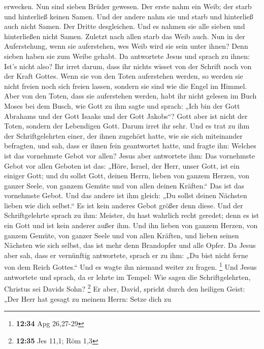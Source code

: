 erwecken.  Nun sind sieben Brüder gewesen. Der erste nahm
ein Weib; der starb und hinterließ keinen Samen.  Und der
andere nahm sie und starb und hinterließ auch nicht Samen. Der Dritte
desgleichen.  Und es nahmen sie alle sieben und
hinterließen nicht Samen. Zuletzt nach allen starb das Weib auch.
 Nun in der Auferstehung, wenn sie auferstehen, wes Weib
wird sie sein unter ihnen? Denn sieben haben sie zum Weibe gehabt.
 Da antwortete Jesus und sprach zu ihnen: Ist's nicht also?
Ihr irret darum, dass ihr nichts wisset von der Schrift noch von der
Kraft Gottes.  Wenn sie von den Toten auferstehen werden,
so werden sie nicht freien noch sich freien lassen, sondern sie sind wie
die Engel im Himmel.  Aber von den Toten, dass sie
auferstehen werden, habt ihr nicht gelesen im Buch Moses bei dem Busch,
wie Gott zu ihm sagte und sprach: „Ich bin der Gott Abrahams und der
Gott Isaaks und der Gott Jakobs``?  Gott aber ist nicht der
Toten, sondern der Lebendigen Gott. Darum irret ihr sehr. 
Und es trat zu ihm der Schriftgelehrten einer, der ihnen zugehört hatte,
wie sie sich miteinander befragten, und sah, dass er ihnen fein
geantwortet hatte, und fragte ihn: Welches ist das vornehmste Gebot vor
allen?  Jesus aber antwortete ihm: Das vornehmste Gebot vor
allen Geboten ist das: „Höre, Israel, der Herr, unser Gott, ist ein
einiger Gott;  und du sollst Gott, deinen Herrn, lieben von
ganzem Herzen, von ganzer Seele, von ganzem Gemüte und von allen deinen
Kräften.`` Das ist das vornehmste Gebot.  Und das andere
ist ihm gleich: „Du sollst deinen Nächsten lieben wie dich selbst.`` Es
ist kein anderes Gebot größer denn diese.  Und der
Schriftgelehrte sprach zu ihm: Meister, du hast wahrlich recht geredet;
denn es ist ein Gott und ist kein anderer außer ihm.  Und
ihn lieben von ganzem Herzen, von ganzem Gemüte, von ganzer Seele und
von allen Kräften, und lieben seinen Nächsten wie sich selbst, das ist
mehr denn Brandopfer und alle Opfer.  Da Jesus aber sah,
dass er vernünftig antwortete, sprach er zu ihm: „Du bist nicht ferne
von dem Reich Gottes.`` Und es wagte ihn niemand weiter zu fragen.
\footnote{\textbf{12:34} Apg 26,27-29}  Und Jesus
antwortete und sprach, da er lehrte im Tempel: Wie sagen die
Schriftgelehrten, Christus sei Davids Sohn? \footnote{\textbf{12:35} Jes
  11,1; Röm 1,3}  Er aber, David, spricht durch den
heiligen Geist: „Der Herr hat gesagt zu meinem Herrn: Setze dich zu
